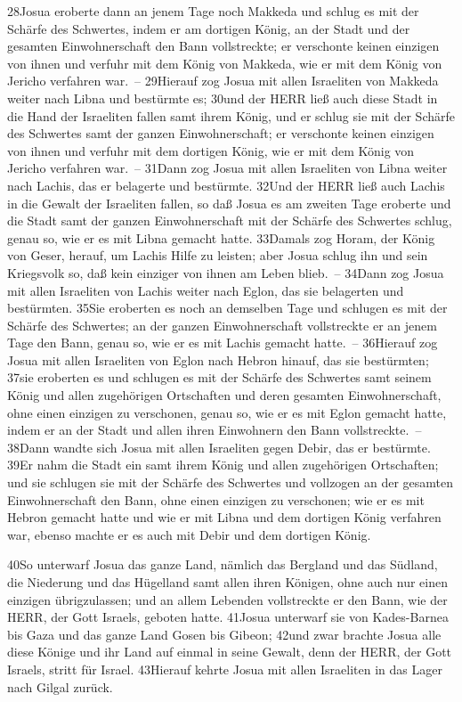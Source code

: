 28Josua eroberte dann an jenem Tage noch Makkeda und schlug es mit der
Schärfe des Schwertes, indem er am dortigen König, an der Stadt und der
gesamten Einwohnerschaft den Bann vollstreckte; er verschonte keinen
einzigen von ihnen und verfuhr mit dem König von Makkeda, wie er mit dem
König von Jericho verfahren war.~-- 29Hierauf zog Josua mit allen
Israeliten von Makkeda weiter nach Libna und bestürmte es; 30und der
HERR ließ auch diese Stadt in die Hand der Israeliten fallen samt ihrem
König, und er schlug sie mit der Schärfe des Schwertes samt der ganzen
Einwohnerschaft; er verschonte keinen einzigen von ihnen und verfuhr mit
dem dortigen König, wie er mit dem König von Jericho verfahren war.~--
31Dann zog Josua mit allen Israeliten von Libna weiter nach Lachis, das
er belagerte und bestürmte. 32Und der HERR ließ auch Lachis in die
Gewalt der Israeliten fallen, so daß Josua es am zweiten Tage eroberte
und die Stadt samt der ganzen Einwohnerschaft mit der Schärfe des
Schwertes schlug, genau so, wie er es mit Libna gemacht hatte. 33Damals
zog Horam, der König von Geser, herauf, um Lachis Hilfe zu leisten; aber
Josua schlug ihn und sein Kriegsvolk so, daß kein einziger von ihnen am
Leben blieb.~-- 34Dann zog Josua mit allen Israeliten von Lachis weiter
nach Eglon, das sie belagerten und bestürmten. 35Sie eroberten es noch
an demselben Tage und schlugen es mit der Schärfe des Schwertes; an der
ganzen Einwohnerschaft vollstreckte er an jenem Tage den Bann, genau so,
wie er es mit Lachis gemacht hatte.~-- 36Hierauf zog Josua mit allen
Israeliten von Eglon nach Hebron hinauf, das sie bestürmten; 37sie
eroberten es und schlugen es mit der Schärfe des Schwertes samt seinem
König und allen zugehörigen Ortschaften und deren gesamten
Einwohnerschaft, ohne einen einzigen zu verschonen, genau so, wie er es
mit Eglon gemacht hatte, indem er an der Stadt und allen ihren
Einwohnern den Bann vollstreckte.~-- 38Dann wandte sich Josua mit allen
Israeliten gegen Debir, das er bestürmte. 39Er nahm die Stadt ein samt
ihrem König und allen zugehörigen Ortschaften; und sie schlugen sie mit
der Schärfe des Schwertes und vollzogen an der gesamten Einwohnerschaft
den Bann, ohne einen einzigen zu verschonen; wie er es mit Hebron
gemacht hatte und wie er mit Libna und dem dortigen König verfahren war,
ebenso machte er es auch mit Debir und dem dortigen König.

40So unterwarf Josua das ganze Land, nämlich das Bergland und das
Südland, die Niederung und das Hügelland samt allen ihren Königen, ohne
auch nur einen einzigen übrigzulassen; und an allem Lebenden
vollstreckte er den Bann, wie der HERR, der Gott Israels, geboten hatte.
41Josua unterwarf sie von Kades-Barnea bis Gaza und das ganze Land Gosen
bis Gibeon; 42und zwar brachte Josua alle diese Könige und ihr Land auf
einmal in seine Gewalt, denn der HERR, der Gott Israels, stritt für
Israel. 43Hierauf kehrte Josua mit allen Israeliten in das Lager nach
Gilgal zurück.

